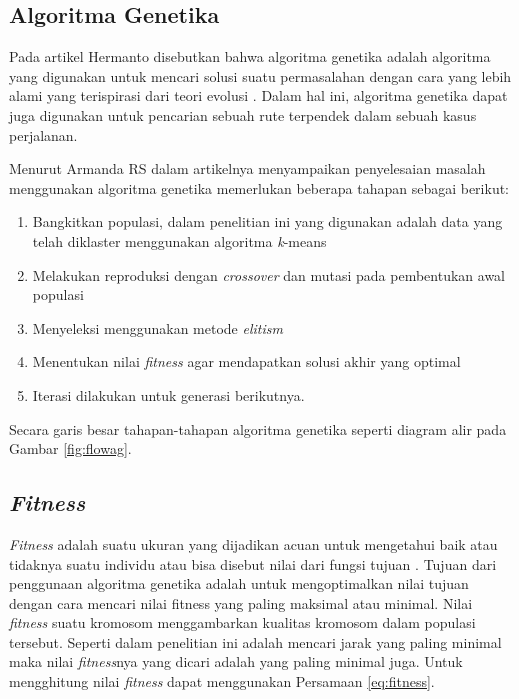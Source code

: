 \subsection{Algoritma Genetika}

Pada artikel Hermanto disebutkan bahwa algoritma genetika adalah algoritma yang digunakan untuk mencari solusi suatu permasalahan dengan cara yang lebih alami yang terispirasi dari teori evolusi  \cite{hermawanto2003algoritma}. Dalam hal ini, algoritma genetika dapat juga digunakan untuk pencarian sebuah rute terpendek dalam sebuah kasus perjalanan.

Menurut Armanda RS \cite{armanda2016penerapan} dalam artikelnya menyampaikan penyelesaian masalah menggunakan algoritma genetika memerlukan beberapa tahapan sebagai berikut:

\begin{enumerate}
	\item Bangkitkan populasi, dalam penelitian ini yang digunakan adalah data yang telah diklaster menggunakan algoritma \textit{k}-means
	\item Melakukan reproduksi dengan \textit{crossover} dan mutasi pada pembentukan awal populasi
	\item Menyeleksi menggunakan metode \textit{elitism}
	\item Menentukan nilai \textit{fitness} agar mendapatkan solusi akhir yang optimal
	\item Iterasi dilakukan untuk generasi berikutnya.
\end{enumerate}

\noindent Secara garis besar tahapan-tahapan algoritma genetika seperti diagram alir pada Gambar \ref{fig:flowag}.



\subsection{\textit{Fitness}}
\textit{Fitness} adalah suatu ukuran yang dijadikan acuan untuk mengetahui baik atau tidaknya suatu individu atau bisa disebut nilai dari fungsi tujuan \cite{basuki2003strategi}. Tujuan dari penggunaan algoritma genetika adalah untuk mengoptimalkan nilai tujuan dengan cara mencari nilai fitness yang paling maksimal atau minimal. Nilai \textit{fitness} suatu kromosom menggambarkan kualitas kromosom dalam populasi tersebut. Seperti dalam penelitian ini adalah mencari jarak yang paling minimal maka nilai \textit{fitness}nya yang dicari adalah yang paling minimal juga. Untuk mengghitung nilai \textit{fitness} dapat menggunakan Persamaan \ref{eq:fitness}.


